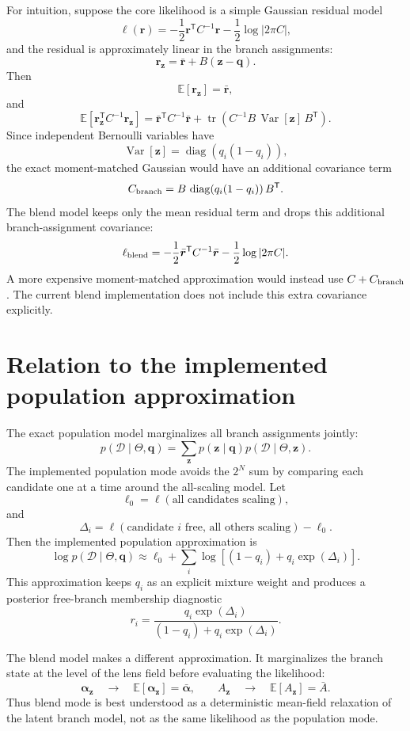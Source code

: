 \documentclass[11pt]{article}
\newcommand{\data}{\mathcal{D}}
\newcommand{\E}{\mathbb{E}}
\newcommand{\Var}{\operatorname{Var}}
\begin{document}
For intuition, suppose the core likelihood is a simple Gaussian residual model
\[
    \ell(\bm{r})
    =
    -\frac{1}{2}\bm{r}^{\mathsf T}C^{-1}\bm{r}
    -
    \frac{1}{2}\log |2\pi C|,
\]
and the residual is approximately linear in the branch assignments:
\[
    \bm{r}_{\bm{z}}
    =
    \bar{\bm{r}}
    +
    B(\bm{z}-\bm{q}).
\]
Then
\[
    \E[\bm{r}_{\bm{z}}]=\bar{\bm{r}},
\]
and
\[
    \E[\bm{r}_{\bm{z}}^{\mathsf T}C^{-1}\bm{r}_{\bm{z}}]
    =
    \bar{\bm{r}}^{\mathsf T}C^{-1}\bar{\bm{r}}
    +
    \operatorname{tr}\!\left(C^{-1}B\,\Var[\bm{z}]\,B^{\mathsf T}\right).
\]
Since independent Bernoulli variables have
\[
    \Var[\bm{z}]
    =
    \operatorname{diag}\!\left(q_i(1-q_i)\right),
\]
the exact moment-matched Gaussian would have an additional covariance term
\[
    C_{\rm branch}
    =
    B\,\operatorname{diag}\!\left(q_i(1-q_i)\right)B^{\mathsf T}.
\]
The blend model keeps only the mean residual term and drops this additional
branch-assignment covariance:
\[
    \ell_{\rm blend}
    =
    -\frac{1}{2}\bar{\bm{r}}^{\mathsf T}C^{-1}\bar{\bm{r}}
    -
    \frac{1}{2}\log |2\pi C|.
\]
A more expensive moment-matched approximation would instead use
$C+C_{\rm branch}$. The current blend implementation does not include this
extra covariance explicitly.

\section{Relation to the implemented population approximation}

The exact population model marginalizes all branch assignments jointly:
\[
    p(\data\mid\Theta,\bm{q})
    =
    \sum_{\bm{z}}p(\bm{z}\mid\bm{q})p(\data\mid\Theta,\bm{z}).
\]
The implemented population mode avoids the $2^N$ sum by comparing each
candidate one at a time around the all-scaling model. Let
\[
    \ell_0
    =
    \ell(\text{all candidates scaling}),
\]
and
\[
    \Delta_i
    =
    \ell(\text{candidate }i\text{ free, all others scaling})
    -
    \ell_0.
\]
Then the implemented population approximation is
\[
    \log p(\data\mid\Theta,\bm{q})
    \approx
    \ell_0
    +
    \sum_i
    \log\!\left[(1-q_i)+q_i\exp(\Delta_i)\right].
\]
This approximation keeps $q_i$ as an explicit mixture weight and produces a
posterior free-branch membership diagnostic
\[
    r_i
    =
    \frac{q_i\exp(\Delta_i)}
    {(1-q_i)+q_i\exp(\Delta_i)}.
\]

The blend model makes a different approximation. It marginalizes the branch
state at the level of the lens field before evaluating the likelihood:
\[
    \bm{\alpha}_{\bm{z}}
    \quad\longrightarrow\quad
    \E[\bm{\alpha}_{\bm{z}}]=\bar{\bm{\alpha}},
    \qquad
    A_{\bm{z}}
    \quad\longrightarrow\quad
    \E[A_{\bm{z}}]=\bar{A}.
\]
Thus blend mode is best understood as a deterministic mean-field relaxation of
the latent branch model, not as the same likelihood as the population mode.
\end{document}
